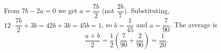 From $7b-2a=0$ we get $a=\dfrac{7b}{2}$ (not $\dfrac{2b}{7}$). Substituting, $12\cdot\dfrac{7b}{2}+3b=42b+3b=45b=1$, so $b=\dfrac{1}{45}$ and $a=\dfrac{7}{90}$. The average is
\[
\dfrac{a+b}{2}=\dfrac{1}{2}\left(\dfrac{7}{90}+\dfrac{2}{90}\right)=\boxed{\dfrac{1}{20}}.
\]
